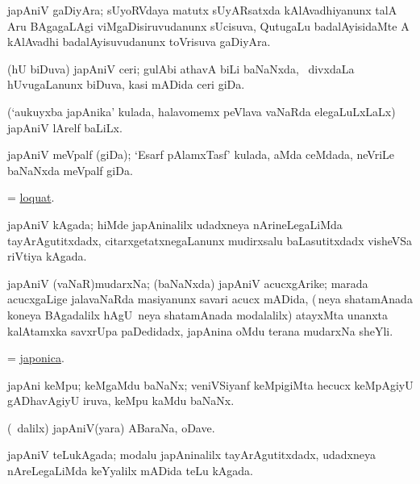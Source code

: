 \bentry
{}
\gl{\nA}
\bmng
japAniV gaDiyAra; sUyoRVdaya matutx sUyARsatxda kAlAvadhiyanunx talA Aru BAgagaLAgi viMgaDisiruvudanunx sUcisuva, QutugaLu badalAyisidaMte A kAlAvadhi badalAyisuvudanunx toVrisuva gaDiyAra. 
\emng
\eentry

\bentry
{}
\gl{\nA}
\bmng
(hU biDuva) japAniV ceri; gulAbi athavA biLi baNaNxda, \sA\ divxdaLa hUvugaLanunx biDuva, kasi mADida ceri giDa. 
\emng
\eentry

\bentry
{}
\gl{\nA}
\bmng
(`aukuyxba japAnika' kulada, halavomemx peVlava vaNaRda elegaLuLxLaLx) japAniV lArelf baLiLx. 
\emng
\eentry

\bentry
{}
\gl{\nA}
\bmng
japAniV meVpalf (giDa); `Esarf pAlamxTasf' kulada, aMda ceMdada, neVriLe baNaNxda meVpalf giDa. 
\emng
\eentry

\bentry
{}
\gl{\nA}
\bmng
= \hyperref{kandict_l.pdf}{L}{loquat}{loquat}. 
\emng
\eentry

\bentry
{}
\gl{\nA}
\bmng
japAniV kAgada; hiMde japAninalilx udadxneya nArineLegaLiMda tayArAgutitxdadx, citarxgetatxnegaLanunx mudirxsalu baLasutitxdadx visheVSa riVtiya kAgada. 
\emng
\eentry

\bentry
{}
\gl{\nA}
\bmng
japAniV (vaNaR)mudarxNa; (baNaNxda) japAniV acucxgArike; marada acucxgaLige jalavaNaRda masiyanunx savari acucx mADida, (\,neya shatamAnada koneya BAgadalilx hAgU \,neya shatamAnada modalalilx) atayxMta unanxta kalAtamxka savxrUpa paDedidadx, japAnina oMdu terana mudarxNa sheYli. 
\emng
\eentry

\bentry
{}
\gl{\nA}
\bmng
 = \hyperlink{japonica}{japonica}. 
\emng
\eentry

\bentry
{}
\gl{\nA}
\bmng
japAni keMpu; keMgaMdu baNaNx; veniVSiyanf keMpigiMta hecucx keMpAgiyU gADhavAgiyU iruva, keMpu kaMdu baNaNx. 
\emng
\eentry


\bentry
{}
\gl{\nA}
\bmng
(\sA\ \bava dalilx) japAniV(yara) ABaraNa, oDave. 
\emng
\eentry

\bentry
{}
\gl{\nA}
\bmng
japAniV teLukAgada; modalu japAninalilx tayArAgutitxdadx, udadxneya nAreLegaLiMda keYyalilx mADida teLu kAgada. 
\emng
\eentry


